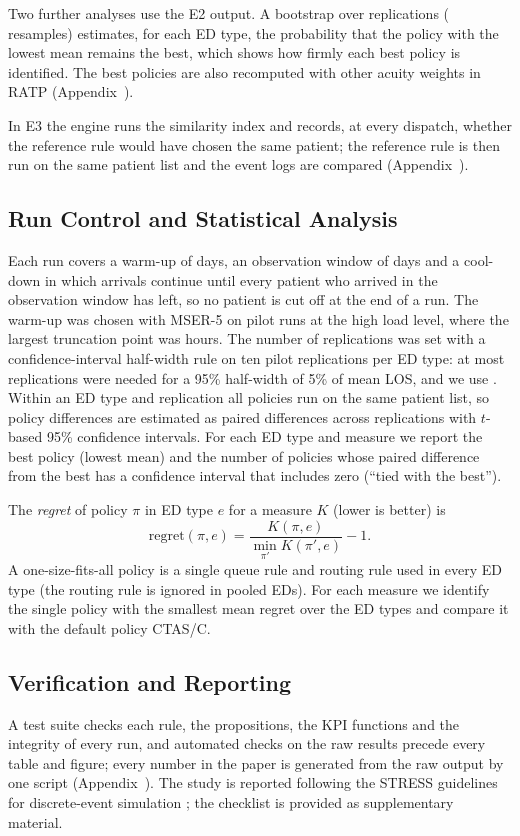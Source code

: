 Two further analyses use the E2 output. A bootstrap over replications (\BootB{} resamples) estimates, for each ED type, the probability that the policy with the lowest mean remains the best, which shows how firmly each best policy is identified. The best policies are also recomputed with other acuity weights in RATP (Appendix~).

In E3 the engine runs the similarity index and records, at every dispatch, whether the reference rule would have chosen the same patient; the reference rule is then run on the same patient list and the event logs are compared (Appendix~).

\subsection{Run Control and Statistical Analysis}

Each run covers a warm-up of \WarmupDays{} days, an observation window of \ObsDays{} days and a cool-down in which arrivals continue until every patient who arrived in the observation window has left, so no patient is cut off at the end of a run. The warm-up was chosen with MSER-5 \cite{Hoad2010_WarmUp} on pilot runs at the high load level, where the largest truncation point was \MserMaxHours{} hours. The number of replications was set with a confidence-interval half-width rule on ten pilot replications per ED type: at most \RepsNeededLosMax{} replications were needed for a 95\% half-width of 5\% of mean LOS, and we use \Reps. Within an ED type and replication all policies run on the same patient list, so policy differences are estimated as paired differences across replications with $t$-based 95\% confidence intervals. For each ED type and measure we report the best policy (lowest mean) and the number of policies whose paired difference from the best has a confidence interval that includes zero (``tied with the best'').

The \emph{regret} of policy $\pi$ in ED type $e$ for a measure $K$ (lower is better) is
\begin{equation}
\text{regret}(\pi,e)=\frac{K(\pi,e)}{\min_{\pi'}K(\pi',e)}-1.
\end{equation} A one-size-fits-all policy is a single queue rule and routing rule used in every ED type (the routing rule is ignored in pooled EDs). For each measure we identify the single policy with the smallest mean regret over the \NEdTypes{} ED types and compare it with the default policy CTAS/C.

\subsection{Verification and Reporting}

A test suite checks each rule, the propositions, the KPI functions and the integrity of every run, and automated checks on the raw results precede every table and figure; every number in the paper is generated from the raw output by one script (Appendix~). The study is reported following the STRESS guidelines for discrete-event simulation \cite{Monks2019_STRESS}; the checklist is provided as supplementary material.
